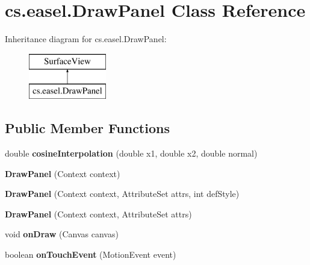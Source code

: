 \hypertarget{classcs_1_1easel_1_1_draw_panel}{\section{cs.\+easel.\+Draw\+Panel Class Reference}
\label{classcs_1_1easel_1_1_draw_panel}
}
Inheritance diagram for cs.\+easel.\+Draw\+Panel\+:\begin{figure}[H]
\begin{center}
\leavevmode
\includegraphics[height=2.000000cm]{classcs_1_1easel_1_1_draw_panel}
\end{center}
\end{figure}
\subsection*{Public Member Functions}
\begin{DoxyCompactItemize}
\item 
\hypertarget{classcs_1_1easel_1_1_draw_panel_aa363ca7d93536d3ad544f36668a8a4be}{double {\bfseries cosine\+Interpolation} (double x1, double x2, double normal)}\label{classcs_1_1easel_1_1_draw_panel_aa363ca7d93536d3ad544f36668a8a4be}

\item 
\hypertarget{classcs_1_1easel_1_1_draw_panel_ace5a2cc679d374f3142c833b3cb69f44}{{\bfseries Draw\+Panel} (Context context)}\label{classcs_1_1easel_1_1_draw_panel_ace5a2cc679d374f3142c833b3cb69f44}

\item 
\hypertarget{classcs_1_1easel_1_1_draw_panel_ad8a01a1b1abcc70e9e9e6cfea620f5c5}{{\bfseries Draw\+Panel} (Context context, Attribute\+Set attrs, int def\+Style)}\label{classcs_1_1easel_1_1_draw_panel_ad8a01a1b1abcc70e9e9e6cfea620f5c5}

\item 
\hypertarget{classcs_1_1easel_1_1_draw_panel_ae087cc858798731f1c746a45b15e6a4a}{{\bfseries Draw\+Panel} (Context context, Attribute\+Set attrs)}\label{classcs_1_1easel_1_1_draw_panel_ae087cc858798731f1c746a45b15e6a4a}

\item 
\hypertarget{classcs_1_1easel_1_1_draw_panel_a09054d42f615ea2169a74e86ca65e605}{void {\bfseries on\+Draw} (Canvas canvas)}\label{classcs_1_1easel_1_1_draw_panel_a09054d42f615ea2169a74e86ca65e605}

\item 
\hypertarget{classcs_1_1easel_1_1_draw_panel_a27d4dc58056d2608e58308be498797ed}{boolean {\bfseries on\+Touch\+Event} (Motion\+Event event)}\label{classcs_1_1easel_1_1_draw_panel_a27d4dc58056d2608e58308be498797ed}

\end{DoxyCompactItemize}

